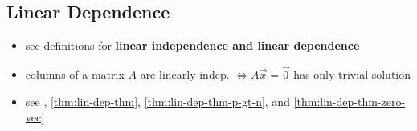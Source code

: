 \documentclass[a4paper,12pt]{article}
\theoremstyle{definition}
\theoremstyle{definition}
\newcommand{\mateq}[3]{#1#2 = #3}
\newcommand{\mateqaxo}{\mateq{A}{\vec{x}}{\vec{0}}}
\begin{document}
	\subsection{Linear Dependence}
	\begin{itemize}
		\item see definitions for \textbf{linear independence and linear dependence}
		
		\item columns of a matrix $A$ are linearly indep. $\Leftrightarrow \mateqaxo$ has only trivial solution
		
		\item see , \autoref{thm:lin-dep-thm}, \autoref{thm:lin-dep-thm-p-gt-n}, and \autoref{thm:lin-dep-thm-zero-vec}
	\end{itemize}
	
\end{document}
